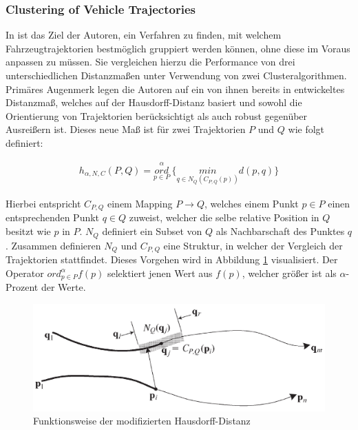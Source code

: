 \subsubsection*{Clustering of Vehicle Trajectories}
\label{sec:atev_et_al}
In \cite[]{Atev2010} ist das Ziel der Autoren, ein Verfahren zu finden, mit welchem Fahrzeugtrajektorien
bestmöglich gruppiert werden können, ohne diese im Voraus anpassen zu müssen.
Sie vergleichen hierzu die Performance von drei unterschiedlichen Distanzmaßen unter Verwendung von zwei Clusteralgorithmen.
Primäres Augenmerk legen die Autoren auf ein von ihnen bereits in \cite[]{Atev2006} entwickeltes Distanzmaß,
welches auf der Hausdorff-Distanz basiert und sowohl die Orientierung von Trajektorien berücksichtigt
als auch robust gegenüber Ausreißern ist. Dieses neue Maß ist für zwei Trajektorien $P$ und $Q$
wie folgt definiert:

\begin{ceqn}
\begin{align}
\label{eq_modHausdorff}
    h_{\alpha, N, C}(P, Q) = \overset{\alpha}{\underset{p \in P}{ord}}\ \Big\{ \underset{q \in N_Q(C_{P,Q}(p))}{min} d(p, q) \Big\}
\end{align}
\end{ceqn}

Hierbei entspricht $C_{P,Q}$ einem Mapping $P \rightarrow Q$, welches einem Punkt $p \in P$ einen entsprechenden
Punkt $q \in Q$ zuweist, welcher die selbe relative Position in $Q$ besitzt wie $p$ in $P$.
$N_Q$ definiert ein Subset von $Q$ als Nachbarschaft des Punktes $q$. Zusammen definieren $N_Q$ und $C_{P,Q}$ eine
Struktur, in welcher der Vergleich der Trajektorien stattfindet. Dieses Vorgehen wird in Abbildung
\ref{fig:relw_atev_modh} visualisiert. Der Operator $ord_{p \in P}^{\alpha} f(p)$ selektiert jenen Wert aus $f(p)$, welcher
größer ist als $\alpha$-Prozent der Werte.

\begin{figure}[H]
    \centering
    \includegraphics[width=0.6\linewidth]{resources/img/RelatedWork/Atev_modHausdorff}
    \caption[Funktionsweise der modifizierten Hausdorff-Distanz]{Funktionsweise der modifizierten Hausdorff-Distanz \cite[]{Atev2010}}
    \label{fig:relw_atev_modh}
\end{figure}

